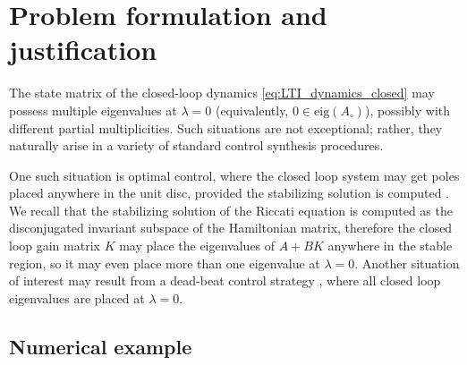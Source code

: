 \documentclass[journal,twoside,web]{ieeecolor}
\begin{document}
\clearpage


\section{Problem formulation and justification}
\label{sec:justication}


The state matrix of the closed-loop dynamics \eqref{eq:LTI_dynamics_closed} may possess multiple eigenvalues at $\lambda = 0$ (equivalently, $0 \in \mathrm{eig}(A_\circ)$), possibly with different partial multiplicities. Such situations are not exceptional; rather, they naturally arise in a variety of standard control synthesis procedures.
% 

One such situation is optimal control, where the closed loop system may get poles placed anywhere in the unit disc, provided the stabilizing solution is computed \cite{ionescu1997general}. We recall that the stabilizing solution of the Riccati equation is computed as the disconjugated invariant subspace of the Hamiltonian matrix, therefore the closed loop gain matrix $K$ may place the eigenvalues of $A+BK$ anywhere in the stable region, so it may even place more than one eigenvalue at $\lambda=0$. Another situation of interest may result from a dead-beat control strategy \cite{van1984deadbeat}, where all closed loop eigenvalues are placed at $\lambda=0$.

\subsection*{Numerical example}
\end{document}
